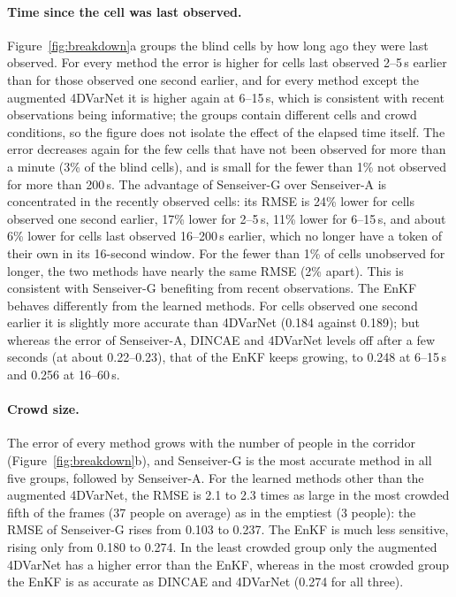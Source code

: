 \documentclass[english, 12pt, a4paper, elec, utf8, a-2b, online]{aaltothesis}
\begin{document}
\paragraph{Time since the cell was last observed.}
Figure~\ref{fig:breakdown}a groups the blind cells by how long ago they were
last observed. For every method the error is higher for cells last observed
2--5\,s earlier than for those observed one second earlier, and for every method
except the augmented 4DVarNet it is higher again at 6--15\,s, which is consistent
with recent observations being informative; the groups contain different cells and crowd conditions, so the
figure does not isolate the effect of the elapsed time itself. The error decreases again for the few cells that have not
been observed for more than a minute (3\% of the blind cells), and is small
for the fewer than 1\% not observed for more than 200\,s. The advantage
of Senseiver\nobreakdash-G over Senseiver\nobreakdash-A is concentrated in the
recently observed cells: its RMSE is 24\% lower for cells observed one second
earlier, 17\% lower for 2--5\,s, 11\% lower for 6--15\,s, and about 6\% lower for
cells last observed 16--200\,s earlier, which no longer have a token of
their own in its 16-second window. For the fewer than 1\% of cells
unobserved for longer, the two methods have nearly the same RMSE (2\% apart). This
is consistent with Senseiver\nobreakdash-G benefiting from recent observations. The EnKF behaves differently from the
learned methods. For cells observed one second earlier it is slightly more
accurate than 4DVarNet (0.184 against 0.189); but whereas the error of Senseiver\nobreakdash-A, DINCAE
and 4DVarNet levels off after a few seconds (at about 0.22--0.23), that of the EnKF
keeps growing, to 0.248 at 6--15\,s and 0.256 at 16--60\,s.

\paragraph{Crowd size.}
The error of every method grows with the number of people in the corridor
(Figure~\ref{fig:breakdown}b), and Senseiver\nobreakdash-G is the most accurate method in
all five groups, followed by Senseiver\nobreakdash-A. For the learned methods other than the
augmented 4DVarNet, the RMSE is 2.1 to 2.3 times as large in the most crowded fifth
of the frames (37 people on average) as in the emptiest (3 people): the RMSE of
Senseiver\nobreakdash-G rises from 0.103 to 0.237. The EnKF is much less sensitive, rising
only from 0.180 to 0.274. In the least crowded group only the augmented
4DVarNet has a higher error than the EnKF, whereas in the most crowded group the EnKF is as
accurate as DINCAE and 4DVarNet (0.274 for all three).
\end{document}
